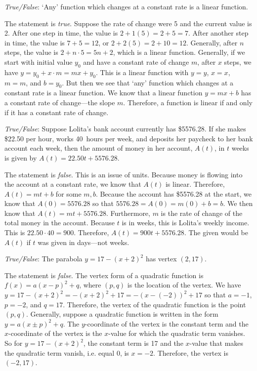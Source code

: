 \documentclass[11pt,letterpaper]{article}
\begin{document}
\quizsol \textit{True/False}: `Any' function which changes at a constant rate is a linear function. \pspace

\sol The statement is \textit{true}. Suppose the rate of change were 5 and the current value is 2. After one step in time, the value is $2 + 1(5)= 2 + 5= 7$. After another step in time, the value is $7 + 5= 12$, or $2 + 2(5)= 2 + 10= 12$. Generally, after $n$ steps, the value is $2 + n \cdot 5= 5n + 2$, which is a linear function. Generally, if we start with initial value $y_0$ and have a constant rate of change $m$, after $x$ steps, we have $y= y_0 + x \cdot m= mx + y_0$. This is a linear function with $y= y$, $x= x$, $m= m$, and $b= y_0$. But then we see that `any' function which changes at a constant rate is a linear function. We know that a linear function $y= mx + b$ has a constant rate of change---the slope $m$. Therefore, a function is linear if and only if it has a constant rate of change. 



\newpage



\quizsol \textit{True/False}: Suppose Lolita's bank account currently has \$5576.28. If she makes \$22.50 per hour, works 40~hours per week, and deposits her paycheck to her bank account each week, then the amount of money in her account, $A(t)$, in $t$ weeks is given by $A(t)= 22.50t + 5576.28$. \pspace

\sol The statement is \textit{false}. This is an issue of units. Because money is flowing into the account at a constant rate, we know that $A(t)$ is linear. Therefore, $A(t)= mt + b$ for some $m, b$. Because the account has \$5576.28 at the start, we know that $A(0)= 5576.28$ so that $5576.28= A(0)= m(0) + b= b$. We then know that $A(t)= mt + 5576.28$. Furthermore, $m$ is the rate of change of the total money in the account. Because $t$ is in weeks, this is Lolita's weekly income. This is $22.50 \cdot 40= 900$. Therefore, $A(t)= 900t + 5576.28$. The given would be $A(t)$ if $t$ was given in days---not weeks. \pvspace{1cm}



\quizsol \textit{True/False}: The parabola $y= 17 - (x + 2)^2$ has vertex $(2, 17)$. \pspace

\sol The statement is \textit{false}. The vertex form of a quadratic function is $f(x)= a(x - p)^2 + q$, where $(p, q)$ is the location of the vertex. We have $y= 17 - (x + 2)^2= -(x + 2)^2 + 17= -(x - (-2))^2 + 17$ so that $a= -1$, $p= -2$, and $q= 17$. Therefore, the vertex of the quadratic function is the point $(p, q)$. Generally, suppose a quadratic function is written in the form $y= a(x \pm p)^2 + q$. The $y$-coordinate of the vertex is the constant term and the $x$-coordinate of the vertex is the $x$-value for which the quadratic term vanishes. So for $y= 17 - (x+ 2)^2$, the constant term is 17 and the $x$-value that makes the quadratic term vanish, i.e. equal 0, is $x= -2$. Therefore, the vertex is $(-2, 17)$. \pvspace{1cm}
\end{document}
